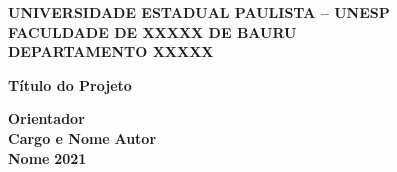 \begin{titlepage}

\begin{center}
    \large
    {\bf UNIVERSIDADE ESTADUAL PAULISTA – UNESP} \\ 
    {\bf FACULDADE DE XXXXX DE BAURU} \\
    {\bf DEPARTAMENTO XXXXX} \\
    
    \par
    \vspace{215pt}
        {\Large \bf Título do Projeto}
    \vspace{7pt}
    
    \par
    \vfill
        {\large  \bf Orientador} \\
        {\large  \bf Cargo e Nome} 
    \vfill
        {\large  \bf Autor} \\
        {\large  \bf Nome} 
    \vfill
        \textbf{%
        {\large 2021}}
    \end{center}
\end{titlepage}

